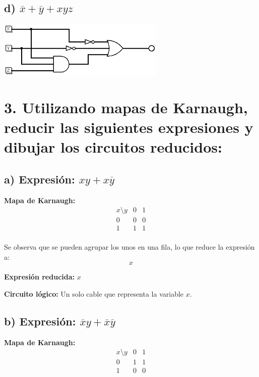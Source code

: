 \documentclass[11pt,letterpaper]{article}
\begin{document}
\subsection*{d) $\overline{x} + \overline{y} + xyz$}
\begin{center}
  \includegraphics[width=8cm]{./imagenes/Ej2d.png}
\end{center}

\section*{3. Utilizando mapas de Karnaugh, reducir las siguientes expresiones y dibujar los circuitos reducidos:}

\subsection*{a) Expresión: \( xy + x\overline{y} \)}

\textbf{Mapa de Karnaugh:}\[
\begin{array}{c|cc}
x \setminus y & 0 & 1 \\
\hline
0 & 0 & 0 \\
1 & 1 & 1 \\
\end{array}
\]

Se observa que se pueden agrupar los unos en una fila, lo que reduce la expresión a:
\[
x
\]

\textbf{Expresión reducida:} \( x \)

\textbf{Circuito lógico:} Un solo cable que representa la variable \( x \).

\subsection*{b) Expresión: \( \overline{x}y + \overline{x}\overline{y} \)}

\textbf{Mapa de Karnaugh:}
\[
\begin{array}{c|cc}
x \setminus y & 0 & 1 \\
\hline
0 & 1 & 1 \\
1 & 0 & 0 \\
\end{array}
\]
\end{document}
